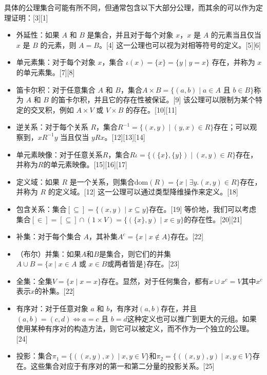 具体的公理集合可能有所不同，但通常包含以下大部分公理，而其余的可以作为定理证明：[3][1]
\begin{itemize}
\item 外延性：如果 \( A \) 和 \( B \) 是集合，并且对于每个对象 \( x \)，\( x \) 是 \( A \) 的元素当且仅当 \( x \) 是 \( B \) 的元素，则 \( A = B \)。[4] 这一公理也可以视为对相等符号的定义。[5][6]
\item 单元素集：对于每个对象 \( x \)，集合 \( \iota(x) = \{x\} = \{y \mid y = x\} \) 存在，并称为 \( x \) 的单元素集。[7][8]
\item 笛卡尔积：对于任意集合 \( A \) 和 \( B \)，集合\(A \times B = \{(a, b) \mid a \in A \text{ 且 } b \in B\}\)称为 \( A \) 和 \( B \) 的笛卡尔积，并且它的存在性被保证。[9] 该公理可以限制为某个特定的交叉积，例如 \( A \times V \) 或 \( V \times B \) 的存在。[10][11]
\item 逆关系：对于每个关系 \( R \)，集合\(R^{-1} = \{(x, y) \mid (y, x) \in R\}\)存在；可以观察到，\( x R^{-1} y \) 当且仅当 \( y R x \)。[12][13][14]
\item 单元素映像：对于任意关系\( R \)，集合\(R\iota = \{(\{x\}, \{y\}) \mid (x, y) \in R\}\)存在，并称为\( R \)的单元素映像。[15][16][17]
\item 定义域：如果 \( R \) 是一个关系，则集合\(\text{dom}(R) = \{x \mid \exists y . (x, y) \in R\}\)存在，并称为 \( R \) 的定义域。[12] 这一公理可以通过类型降维操作来定义。[18]
\item 包含关系：集合\([\subseteq] = \{(x, y) \mid x \subseteq y\}\)存在。[19] 等价地，我们可以考虑集合\([\in] = [\subseteq] \cap (1 \times V) = \{(\{x\}, y) \mid x \in y\}\)的存在性。[20][21]
\item 补集：对于每个集合 \( A \)，其补集\(A^c = \{x \mid x \notin A\}\)存在。[22]
\item （布尔）并集：如果\(A\)和\(B\)是集合，则它们的并集\(A\cup B=\{x \mid x \in A\text{ 或 }x \in B\text{或两者皆是}\}\)存在。[23]
\item 全集：全集\(V = \{x \mid x = x\}\)存在。显然，对于任何集合\( \)，都有\(x \cup x^c = V\)其中\( x^c \)表示\( x \)的补集。[22]
\item 有序对：对于任意对象 \( a \) 和 \( b \)，有序对\((a, b)\)存在，并且\((a, b) = (c, d)\iff a = c \text{ 且 } b = d\)这种定义也可以推广到更大的元组。如果使用某种有序对的构造方法，则它可以被定义，而不作为一个独立的公理。[24]
\item 投影：集合\(\pi_1 = \{((x,y), x) \mid x, y \in V\}\)和\(\pi_2 = \{((x,y), y) \mid x, y \in V\}\)存在。这些集合对应于有序对的第一和第二分量的投影关系。[25]

\end{itemize}
